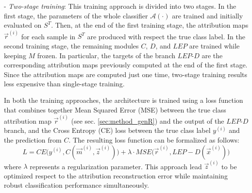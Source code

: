 - \textit{Two-stage training}:  This training approach is divided into two stages. In the first stage, the parameters of the whole classifier  $\mathcal{A}(\cdot)$ are trained and initially evaluated on $S^T$. Then, at the end of the first training stage, the attribution maps $\vec{r}^{(i)}$ for each sample in $S^T$ are produced with respect the true class label. In the second training stage, the remaining modules $C$, $D$, and $LEP$ are trained while keeping $M$ frozen. In particular, the targets of the branch $LEP$-$D$ are the corresponding attribution maps previously computed at the end of the first stage.  Since the attribution maps are computed just one time, two-stage training results less expensive than single-stage training. 

In both the training approaches, the architecture is trained using a loss function that combines together Mean Squared Error (MSE) between the true class attribution map $\vec{r}^{(i)}$ (see sec. \ref{sec:method_genR}) and the output of the $LEP$-$D$ branch, and the Cross Entropy (CE) loss between the true class label $y^{(i)}$ and the prediction from $C$. The resulting loss function can be formalized as follows: 
\begin{equation}
    L = CE\big(y^{(i)}, C(\vec{m}^{(i)}, \vec{z}^{(i)})\big) + \lambda \cdot MSE\big(\vec{r}^{(i)}, LEP-D(\vec{x}^{(i)})\big)
\label{eq:loss}
\end{equation} where $\lambda$ represents a regularization parameter. This approach lead $\vec{z}^{(i)}$ to be optimized respect to the attribution reconstruction error while maintaining robust classification performance simultaneously.



